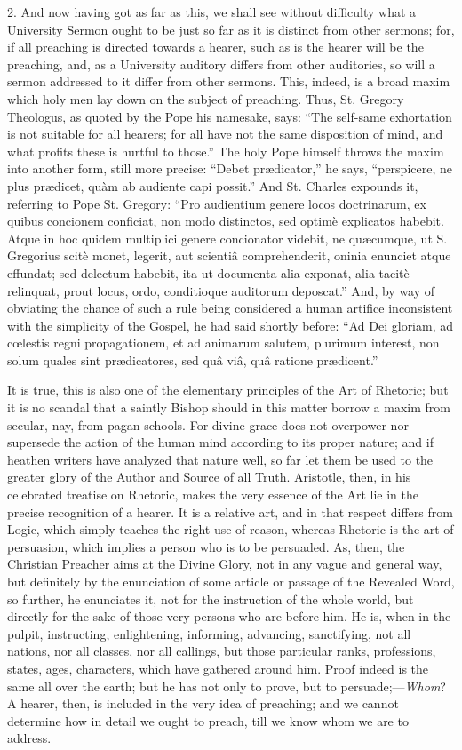 2. And now having got as far as this, we shall see without
difficulty what a University Sermon ought to be just so far as it is
distinct from other sermons; for, if all preaching is directed towards
a hearer, such as is the hearer will be the preaching, and, as a
University auditory differs from other auditories, so will a sermon
addressed to it differ from other sermons. This, indeed, is a broad
maxim which holy men lay down on the subject of preaching. Thus, St.
Gregory Theologus, as quoted by the Pope his namesake, says: ``The
self-same exhortation is not suitable for all hearers; for all have
not the same disposition of mind, and what profits these is hurtful to
those.'' The holy Pope himself throws the maxim into another form,
still more precise: ``Debet prædicator,'' he says, ``perspicere,
ne plus prædicet, quàm ab audiente capi possit.'' And St.
Charles expounds it, referring to Pope St. Gregory: ``Pro
audientium genere locos doctrinarum, ex quibus concionem conficiat,
non modo distinctos, sed optimè explicatos habebit. Atque in hoc
quidem multiplici genere concionator videbit, ne quæcumque, ut S.
Gregorius scitè monet, legerit, aut scientiâ comprehenderit, oninia
enunciet atque effundat; sed delectum habebit, ita ut documenta alia
exponat, alia tacitè relinquat, prout locus, ordo, conditioque
auditorum deposcat.'' And, by way of obviating the chance of such
a rule being considered a human artifice inconsistent with the
simplicity of the Gospel, he had said shortly before: ``Ad Dei
gloriam, ad cœlestis regni propagationem, et ad animarum salutem,
plurimum interest, non solum quales sint prædicatores, sed quâ viâ,
quâ ratione prædicent.''

It is true, this is also one of the elementary principles of the
Art of Rhetoric; but it is no scandal that a saintly Bishop should in
this matter borrow a maxim from secular, nay, from pagan schools. For
divine grace does not overpower nor supersede the action of the
human mind according to its proper nature; and if heathen writers have
analyzed that nature well, so far let them be used to the greater
glory of the Author and Source of all Truth. Aristotle, then, in his
celebrated treatise on Rhetoric, makes the very essence of the Art lie
in the precise recognition of a hearer. It is a relative art, and in
that respect differs from Logic, which simply teaches the right use of
reason, whereas Rhetoric is the art of persuasion, which implies a
person who is to be persuaded. As, then, the Christian Preacher aims
at the Divine Glory, not in any vague and general way, but definitely
by the enunciation of some article or passage of the Revealed Word, so
further, he enunciates it, not for the instruction of the whole world,
but directly for the sake of those very persons who are before him. He
is, when in the pulpit, instructing, enlightening, informing,
advancing, sanctifying, not all nations, nor all classes, nor all
callings, but those particular ranks, professions, states, ages,
characters, which have gathered around him. Proof indeed is the same
all over the earth; but he has not only to prove, but to persuade;—\emph{Whom}?
A hearer, then, is included in the very idea of preaching; and we
cannot determine how in detail we ought to preach, till we know whom
we are to address.

